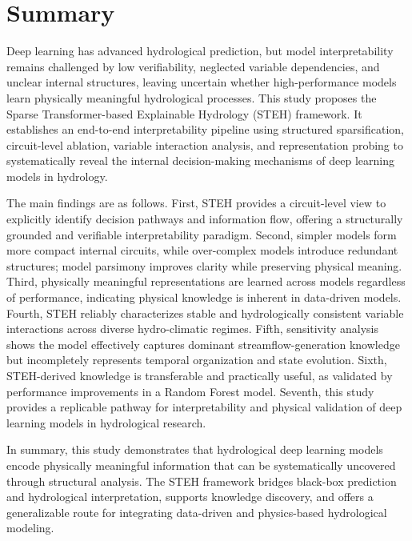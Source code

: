 \section{Summary}

Deep learning has advanced hydrological prediction, but model interpretability remains challenged by low verifiability, neglected variable dependencies\cite{e24050687_Shap_problem}, and unclear internal structures\cite{kumar2020_Shap_problem}, leaving uncertain whether high-performance models learn physically meaningful hydrological processes\cite{ReviewOfXAI}.
This study proposes the Sparse Transformer-based Explainable Hydrology (STEH) framework. It establishes an end-to-end interpretability pipeline using structured sparsification, circuit-level ablation, variable interaction analysis\cite{wang2022interpretabilitywildcircuitindirect}, and representation probing to systematically reveal the internal decision-making mechanisms of deep learning models in hydrology.

The main findings are as follows. First, STEH provides a circuit-level view to explicitly identify decision pathways and information flow, offering a structurally grounded and verifiable interpretability paradigm. Second, simpler models form more compact internal circuits, while over-complex models introduce redundant structures; model parsimony improves clarity while preserving physical meaning. Third, physically meaningful representations are learned across models regardless of performance, indicating physical knowledge is inherent in data-driven models. Fourth, STEH reliably characterizes stable and hydrologically consistent variable interactions across diverse hydro-climatic regimes. Fifth, sensitivity analysis shows the model effectively captures dominant streamflow-generation knowledge but incompletely represents temporal organization and state evolution. Sixth, STEH-derived knowledge is transferable and practically useful, as validated by performance improvements in a Random Forest model. Seventh, this study provides a replicable pathway for interpretability and physical validation of deep learning models in hydrological research.

In summary, this study demonstrates that hydrological deep learning models encode physically meaningful information that can be systematically uncovered through structural analysis. The STEH framework bridges black-box prediction and hydrological interpretation, supports knowledge discovery, and offers a generalizable route for integrating data-driven and physics-based hydrological modeling.